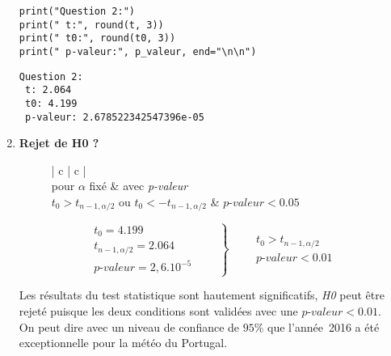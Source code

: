 \begin{enumerate}
\begin{lstlisting}[style=myPython, caption=Code Python question 2, frame=lines]
print("Question 2:")
print(" t:", round(t, 3))
print(" t0:", round(t0, 3))
print(" p-valeur:", p_valeur, end="\n\n")
\end{lstlisting}

\begin{lstlisting}[style=myLog, caption=Résultat du code, frame=lines]
Question 2:
 t: 2.064
 t0: 4.199
 p-valeur: 2.678522342547396e-05
\end{lstlisting}


    \item \textbf{Rejet de H0 ?}
        \begin{figure}[!h]
            \centering
            \begin{minipage}{.48\linewidth}
                \begin{center}
                    \begin{tabular}{| c | c |}
                        \hline
                         \\
                        pour $\alpha$ fixé & avec \textit{p-valeur} \\ \hline
                        $t_{0} > t_{n-1, \alpha/2}$ ou $t_{0} < - t_{n-1, \alpha/2}$ & $ \textit{p-valeur} < 0.05 $\\ \hline
                    \end{tabular}
                \end{center}
            \end{minipage}\hfill\vline
            \begin{minipage}{.48\linewidth}
                \begin{equation*}
                    \left .
                    \begin{aligned}
                        t_{0} = 4.199 \\
                        t_{n-1, \alpha/2} = 2.064\\
                        \textit{p-valeur} = 2,6.10^{-5}
                    \end{aligned} \qquad
                    \right\} \qquad
                    \begin{aligned} 
                        t_{0} > t_{n-1, \alpha/2}\\
                        \textit{p-valeur} < 0.01
                    \end{aligned}
                \end{equation*}
            \end{minipage}
        \end{figure}

        Les résultats du test statistique sont hautement significatifs, \textit{H0} peut être rejeté puisque les deux conditions sont validées avec une $\textit{p-valeur} < 0.01$. \\
        On peut dire avec un niveau de confiance de $95\%$ que l'année~2016 a été exceptionnelle pour la météo du Portugal.
\end{enumerate}
